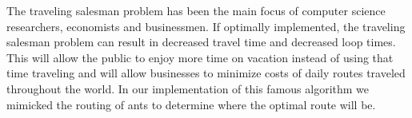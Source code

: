 The traveling salesman problem has been the main focus of computer science researchers, economists and businessmen. If optimally implemented, the traveling salesman problem can result in decreased travel time and decreased loop times. This will allow the public to enjoy more time on vacation instead of using that time traveling and will allow businesses to minimize costs of daily routes traveled throughout the world. In our implementation of this famous algorithm we mimicked the routing of ants to determine where the optimal route will be. 

